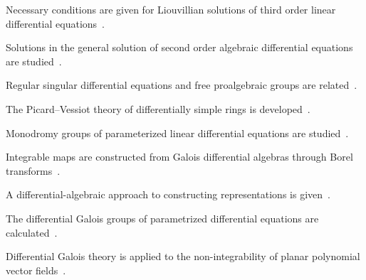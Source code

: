 Necessary conditions are given for Liouvillian solutions of third order linear differential equations~\cite{WlNecessaryConditionsForLiouvill2020}.

Solutions in the general solution of second order algebraic differential equations are studied~\cite{WlSolutionsInTheGeneralSolutionO2020}.

Regular singular differential equations and free proalgebraic groups are related~\cite{WlRegularSingularDifferentialEqu2020}.

The Picard--Vessiot theory of differentially simple rings is developed~\cite{WlPicardVessiotTheoryOfDifferent2020}.

Monodromy groups of parameterized linear differential equations are studied~\cite{WlMonodromyGroupsOfParameterized2020}.

Integrable maps are constructed from Galois differential algebras through Borel transforms~\cite{WlIntegrableMapsFromGaloisDiffer2020}.

A differential-algebraic approach to constructing representations is given~\cite{WlDifferentialAlgebraicApproachT2020}.

The differential Galois groups of parametrized differential equations are calculated~\cite{WlCalculatingDifferentialGaloisG2020}.

Differential Galois theory is applied to the non-integrability of planar polynomial vector fields~\cite{WlDifferentialGaloisTheoryAndNon2020}.

